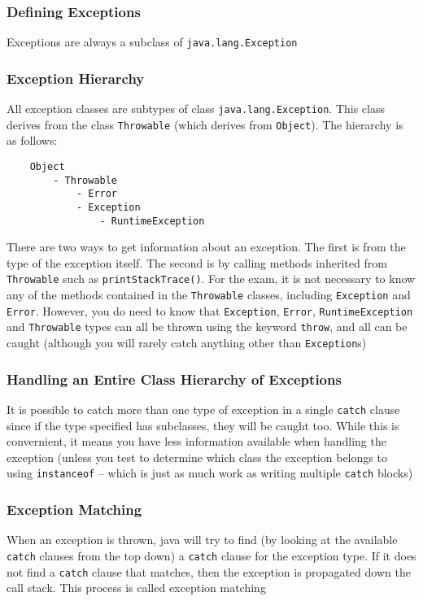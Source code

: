 \subsubsection{Defining Exceptions}
Exceptions are always a subclass of \verb#java.lang.Exception#

\subsubsection{Exception Hierarchy}
All exception classes are subtypes of class \verb#java.lang.Exception#. This 
class derives from the class \verb#Throwable# (which derives from 
\verb#Object#). The hierarchy is as follows:
\begin{verbatim}
    Object
        - Throwable
            - Error
            - Exception
                - RuntimeException
\end{verbatim}
There are two ways to get information about an exception. The first is from the 
type of the exception itself. The second is by calling methods inherited from 
\verb#Throwable# such as \verb#printStackTrace()#. For the exam, it is not 
necessary to know any of the methods contained in the \verb#Throwable# classes, 
including \verb#Exception# and \verb#Error#. However, you do need to know that 
\verb#Exception#, \verb#Error#, \verb#RuntimeException# and \verb#Throwable# 
types can all be thrown using the keyword \verb#throw#, and all can be caught 
(although you will rarely catch anything other than \verb#Exception#s)

\subsubsection{Handling an Entire Class Hierarchy of Exceptions}
It is possible to catch more than one type of exception in a single 
\verb#catch# clause since if the type specified has subclasses, they will be 
caught too. While this is convernient, it means you have less information 
available when handling the exception (unless you test to determine which class 
the exception belongs to using \verb#instanceof# -- which is just as much work 
as writing multiple \verb#catch# blocks)

\subsubsection{Exception Matching}
When an exception is thrown, java will try to find (by looking at the available 
\verb#catch# clauses from the top down) a \verb#catch# clause for the exception 
type. If it does not find a \verb#catch# clause that matches, then the 
exception is propagated down the call stack. This process is called exception 
matching

